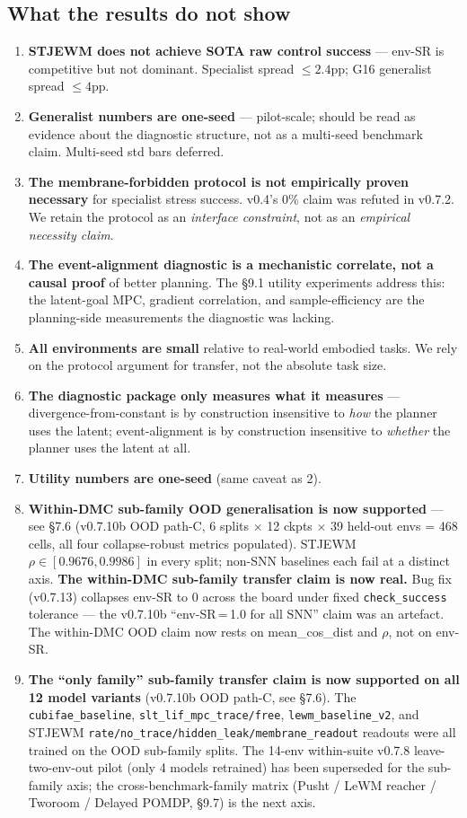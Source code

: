 \documentclass{article}
\begin{document}
\subsection{What the results do not show}

\begin{enumerate}
\item \textbf{STJEWM does not achieve SOTA raw control success} --- env-SR is
competitive but not dominant. Specialist spread $\leq 2.4$pp; G16
generalist spread $\leq 4$pp.
\item \textbf{Generalist numbers are one-seed} --- pilot-scale; should be read
as evidence about the diagnostic structure, not as a multi-seed
benchmark claim. Multi-seed std bars deferred.
\item \textbf{The membrane-forbidden protocol is not empirically proven
necessary} for specialist stress success. v0.4's 0\% claim was
refuted in v0.7.2. We retain the protocol as an \emph{interface
constraint}, not as an \emph{empirical necessity claim}.
\item \textbf{The event-alignment diagnostic is a mechanistic correlate, not a
causal proof} of better planning. The §9.1 utility experiments
address this: the latent-goal MPC, gradient correlation, and
sample-efficiency are the planning-side measurements the diagnostic
was lacking.
\item \textbf{All environments are small} relative to real-world embodied
tasks. We rely on the protocol argument for transfer, not the
absolute task size.
\item \textbf{The diagnostic package only measures what it measures} ---
divergence-from-constant is by construction insensitive to \emph{how}
the planner uses the latent; event-alignment is by construction
insensitive to \emph{whether} the planner uses the latent at all.
\item \textbf{Utility numbers are one-seed} (same caveat as 2).
\item \textbf{Within-DMC sub-family OOD generalisation is now supported} ---
see §7.6 (v0.7.10b OOD path-C, 6 splits $\times$ 12 ckpts
$\times$ 39 held-out envs = 468 cells, all four collapse-robust
metrics populated). STJEWM $\rho \in [0.9676, 0.9986]$ in every
split; non-SNN baselines each fail at a distinct axis. \textbf{The
within-DMC sub-family transfer claim is now real.} Bug fix (v0.7.13)
collapses env-SR to 0 across the board under fixed \texttt{check\_success}
tolerance --- the v0.7.10b ``env-SR\,=\,1.0 for all SNN'' claim was an
artefact. The within-DMC OOD claim now rests on mean\_cos\_dist and
$\rho$, not on env-SR.
\item \textbf{The ``only family'' sub-family transfer claim is now supported
on all 12 model variants} (v0.7.10b OOD path-C, see §7.6). The
\texttt{cubifae\_baseline}, \texttt{slt\_lif\_mpc\_trace/free}, \texttt{lewm\_baseline\_v2},
and STJEWM \texttt{rate/no\_trace/hidden\_leak/membrane\_readout} readouts
were all trained on the OOD sub-family splits. The 14-env
within-suite v0.7.8 leave-two-env-out pilot (only 4 models retrained)
has been superseded for the sub-family axis; the
cross-benchmark-family matrix (Pusht / LeWM reacher / Tworoom /
Delayed POMDP, \S9.7) is the next axis.
\end{enumerate}
\end{document}
